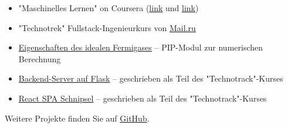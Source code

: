 
\begin{itemize}
    \item "Maschinelles Lernen" on Coursera (\href{https://www.coursera.org/learn/supervised-learning?specialization=machine-learning-data-analysis}{link} und \href{https://www.coursera.org/learn/unsupervised-learning?specialization=machine-learning-data-analysis}{link})
	\item "Technotrek" Fullstack-Ingenieurkurs von \href{https://track.mail.ru/}{\underline{Mail.ru}}
\end{itemize}

\begin{itemize}
    \item \href{https://github.com/alekseik1/ifg-py}{Eigenschaften des idealen Fermigases} -- PIP-Modul zur numerischen Berechnung
    \item \href{https://github.com/alekseik1/tt-ridesharing-backend}{Backend-Server auf Flask} -- geschrieben als Teil des "Technotrack"-Kurses
    \item \href{https://github.com/alekseik1/2018-FS-11-Frontend-Kozharin}{React SPA Schnipsel} -- geschrieben als Teil des "Technotrack"-Kurses
\end{itemize}
Weitere Projekte finden Sie auf \href{https://github.com/alekseik1/}{GitHub}.

